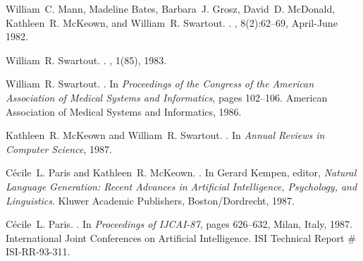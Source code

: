 \begin{thebibliography}{10}
William~C. Mann, Madeline Bates, Barbara~J. Grosz, David~D. McDonald,
  Kathleen~R. McKeown, and William~R. Swartout.
.
, 8(2):62--69,
  April-June 1982.

\noindent\hspace*{\itemindent}{\leftskip=0.1in\rightskip=0.1in\hrulefill}

William~R. Swartout.
.
, 1(85), 1983.

\noindent\hspace*{\itemindent}{\leftskip=0.1in\rightskip=0.1in\hrulefill}

William~R. Swartout.
.
\newblock In {\em Proceedings of the Congress of the American Association of
  Medical Systems and Informatics}, pages 102--106. American Association of
  Medical Systems and Informatics, 1986.

\noindent\hspace*{\itemindent}{\leftskip=0.1in\rightskip=0.1in\hrulefill}

Kathleen~R. McKeown and William~R. Swartout.
.
\newblock In {\em Annual Reviews in Computer Science}, 1987.

\noindent\hspace*{\itemindent}{\leftskip=0.1in\rightskip=0.1in\hrulefill}

C\'{e}cile~L. Paris and Kathleen~R. McKeown.
.
\newblock In Gerard Kempen, editor, {\em Natural Language Generation: Recent
  Advances in Artificial Intelligence, Psychology, and Linguistics}. Kluwer
  Academic Publishers, Boston/Dordrecht, 1987.

\noindent\hspace*{\itemindent}{\leftskip=0.1in\rightskip=0.1in\hrulefill}

C\'{e}cile~L. Paris.
.
\newblock In {\em Proceedings of IJCAI-87}, pages 626--632, Milan, Italy, 1987.
  International Joint Conferences on Artificial Intelligence.
\newblock ISI Technical Report \# ISI-RR-93-311.


\end{thebibliography}
